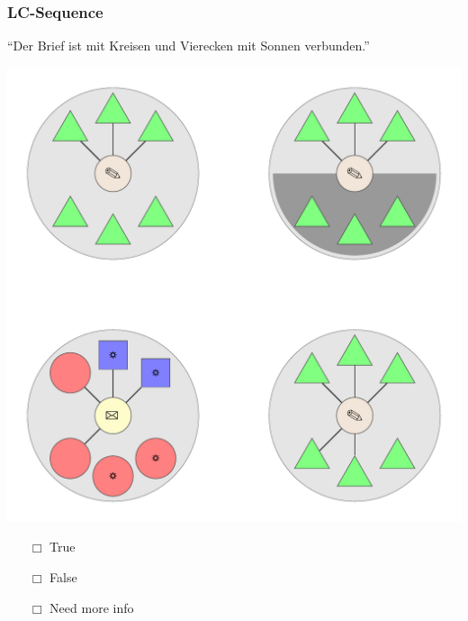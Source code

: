 \documentclass[fleqn,10pt,xcolor=dvipsnames]{beamer}
\newcommand{\LC}{LC\xspace}
\newcommand{\mymark}[1]{{\color{mycol}{#1}}}
\begin{document}
\begin{frame}
  \frametitle{\LC-Sequence}
  \begin{center}
    ``Der Brief ist mit Kreisen und Vierecken mit Sonnen verbunden.''

    \vspace{0.1cm}

    \includegraphics[width=0.5 \textwidth]{../../pictures/lc_01_6.pdf}

    \vspace{0.1cm}

    \begin{multicols}{3}
      \begin{itemize} 
      \item[$\Box$] True\\
        \onslide<2>{$\leadsto$  \mymark{false}}
      \item[$\Box$] False\\
        \onslide<2>{$\leadsto$ \mymark{EC}}
      \item[$\Box$] Need more info 
      \end{itemize}
    \end{multicols}

  \end{center}
\end{frame}
\end{document}
